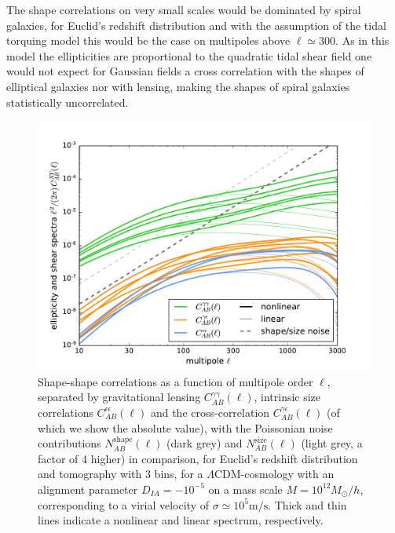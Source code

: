 \documentclass[a4paper,fleqn,usenatbib]{mnras}
\begin{document}
The shape correlations on very small scales would be dominated by spiral galaxies, for Euclid's redshift distribution and with the assumption of the tidal torquing model this would be the case on multipoles above $\ell\simeq 300$. As in this model the ellipticities are proportional to the quadratic tidal shear field one would not expect for Gaussian fields a cross correlation with the shapes of elliptical galaxies nor with lensing, making the shapes of spiral galaxies statistically uncorrelated.

\begin{figure}
\centering
\includegraphics[scale=0.45]{./figures/ia_spectrum.pdf}
\caption{Shape-shape correlations as a function of multipole order $\ell$, separated by gravitational lensing $C_{AB}^{\gamma\gamma}(\ell)$, intrinsic size correlations $C_{AB}^{\epsilon\epsilon}(\ell)$ and the cross-correlation $C_{AB}^{\gamma\epsilon}(\ell)$ (of which we show the absolute value), with the Poissonian noise contributions $N_{AB}^\mathrm{shape}(\ell)$ (dark grey) and $N_{AB}^\mathrm{size}(\ell)$ (light grey, a factor of 4 higher) in comparison, for Euclid's redshift distribution and tomography with 3 bins, for a $\Lambda$CDM-cosmology with an alignment parameter $D_{IA}=-10^{-5}$ on a mass scale $M = 10^{12}M_\odot/h$, corresponding to a virial velocity of $\sigma\simeq10^5\mathrm{m}/\mathrm{s}$. Thick and thin lines indicate a nonlinear and linear spectrum, respectively.}
\label{fig:shapeshape}
\end{figure}
\end{document}
